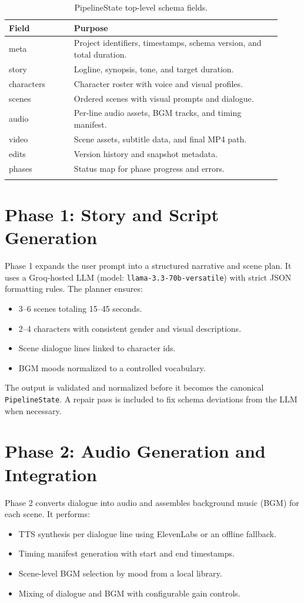 \documentclass[11pt]{article}
\begin{document}
\begin{longtable}{|p{0.22\linewidth}|p{0.70\linewidth}|}
\hline
\textbf{Field} & \textbf{Purpose} \\
\hline
meta & Project identifiers, timestamps, schema version, and total duration. \\
story & Logline, synopsis, tone, and target duration. \\
characters & Character roster with voice and visual profiles. \\
scenes & Ordered scenes with visual prompts and dialogue. \\
audio & Per-line audio assets, BGM tracks, and timing manifest. \\
video & Scene assets, subtitle data, and final MP4 path. \\
edits & Version history and snapshot metadata. \\
phases & Status map for phase progress and errors. \\
\hline
\caption{PipelineState top-level schema fields.}
\label{tab:schema}
\end{longtable}

\section{Phase 1: Story and Script Generation}
Phase 1 expands the user prompt into a structured narrative and scene plan. It uses a Groq-hosted LLM (model: \texttt{llama-3.3-70b-versatile}) with strict JSON formatting rules. The planner ensures:
\begin{itemize}
  \item 3--6 scenes totaling 15--45 seconds.
  \item 2--4 characters with consistent gender and visual descriptions.
  \item Scene dialogue lines linked to character ids.
  \item BGM moods normalized to a controlled vocabulary.
\end{itemize}

The output is validated and normalized before it becomes the canonical \texttt{PipelineState}. A repair pass is included to fix schema deviations from the LLM when necessary.

\section{Phase 2: Audio Generation and Integration}
Phase 2 converts dialogue into audio and assembles background music (BGM) for each scene. It performs:
\begin{itemize}
  \item TTS synthesis per dialogue line using ElevenLabs or an offline fallback.
  \item Timing manifest generation with start and end timestamps.
  \item Scene-level BGM selection by mood from a local library.
  \item Mixing of dialogue and BGM with configurable gain controls.
\end{itemize}
\end{document}
